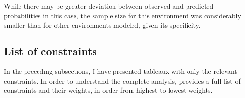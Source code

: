 \documentclass[output=paper,newtxmath,modfonts,nonflat,draftmode]{langsci/langscibook}
\begin{document}
\begin{table}
\caption{Tableau for /ma\#C/ with sample phrase ‘food hits’, $n=6$}
\label{tab:baird:9}
\footnotesize
{}
\end{table}

While there may be greater deviation between observed and predicted probabilities in this case, the sample size for this environment was considerably smaller than for other environments modeled, given its specificity.

\subsection {List of constraints} \label{baird:fulllist}

In the preceding subsections, I have presented tableaux with only the relevant constraints. In order to understand the complete analysis,  provides a full list of constraints and their weights, in order from highest to lowest weights. 
\end{document}
